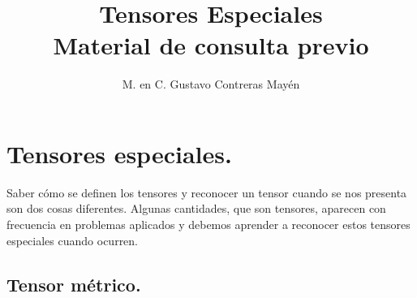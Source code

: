
\usetikzlibrary{babel}
\setlength{\tabcolsep}{12pt}
\title{Tensores Especiales\\ \large{Material de consulta previo}\vspace{-3ex}}
\author{M. en C. Gustavo Contreras Mayén}
\date{ }

\vspace{-4cm}
\maketitle
\fontsize{14}{14}\selectfont
\tableofcontents
\newpage


\section{Tensores especiales.}

Saber cómo se definen los tensores y reconocer un tensor cuando se nos presenta son dos cosas diferentes. Algunas cantidades, que son tensores, aparecen con frecuencia en problemas aplicados y debemos aprender a reconocer estos tensores especiales cuando ocurren.

\subsection{Tensor métrico.}

